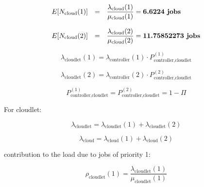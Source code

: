 \documentclass[10pt,a4paper]{article}
\begin{document}
\begin{equation}
\begin{array} {rcl} 
E[N_{\text{cloud}}(1)] & = & \dfrac{\lambda_{\text{cloud}}(1)}{\mu_{\text{cloud}}(1)} = \textbf{6.6224 \text{jobs}}  \\
\\
E[N_{\text{cloud}}(2)] & = & \dfrac{\lambda_{\text{cloud}}(2)}{\mu_{\text{cloud}}(2)} = \textbf{11.75852273 \text{jobs}} 
\\
\end{array}
\end{equation}















\begin{equation}
\lambda_{\text{cloudlet}}(1) = \lambda_{\text{controller}}(1)\cdot P^{(1)}_{\text{controller,cloudlet}}
\end{equation}

\begin{equation}
\lambda_{\text{cloudlet}}(2) = \lambda_{\text{controller}}(2)\cdot P^{(2)}_{\text{controller,cloudlet}}
\end{equation}





\begin{equation}
P^{(1)}_{\text{controller,cloudlet}} = P^{(2)}_{\text{controller,cloudlet}} = 1 - \Pi
\end{equation}

For cloudlet:

\begin{equation}
\lambda_{\text{cloudlet}} = \lambda_{\text{cloudlet}}(1) + \lambda_{\text{cloudlet}}(2)
\end{equation}

\begin{equation}
\lambda_{\text{cloud}} = \lambda_{\text{cloud}}(1) + \lambda_{\text{cloud}}(2)
\end{equation}

contribution to the load due to jobs of priority 1:


\begin{equation}
\rho_{\text{cloudlet}}(1) = \dfrac{\lambda_{\text{cloudlet}}(1)}{\mu_{\text{cloudlet}}(1)} 
\end{equation}
\end{document}
